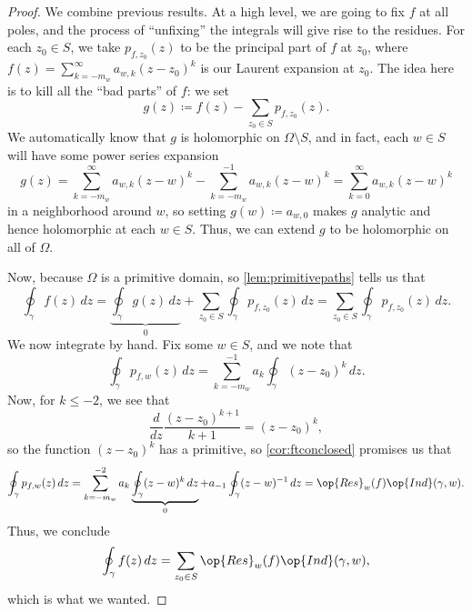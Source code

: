 \begin{proof}
	We combine previous results. At a high level, we are going to fix $f$ at all poles, and the process of ``unfixing'' the integrals will give rise to the residues. For each $z_0\in S$, we take $p_{f,z_0}(z)$ to be the principal part of $f$ at $z_0$, where
	$f(z)=\sum_{k=-m_w}^\infty a_{w,k}(z-z_0)^k$
	is our Laurent expansion at $z_0$. The idea here is to kill all the ``bad parts'' of $f$: we set
	\[g(z)\coloneqq f(z)-\sum_{z_0\in S}p_{f,z_0}(z).\]
	We automatically know that $g$ is holomorphic on $\Omega\setminus S$, and in fact, each $w\in S$ will have some power series expansion
	\[g(z)=\sum_{k=-m_w}^\infty a_{w,k}(z-w)^k-\sum_{k=-m_w}^{-1}a_{w,k}(z-w)^k=\sum_{k=0}^\infty a_{w,k}(z-w)^k\]
	in a neighborhood around $w$, so setting $g(w)\coloneqq a_{w,0}$ makes $g$ analytic and hence holomorphic at each $w\in S$. Thus, we can extend $g$ to be holomorphic on all of $\Omega$.

	Now, because $\Omega$ is a primitive domain, so \autoref{lem:primitivepaths} tells us that
	\[\oint_\gamma f(z)\,dz=\underbrace{\oint_\gamma g(z)\,dz}_0+\sum_{z_0\in S}\oint_\gamma p_{f,z_0}(z)\,dz=\sum_{z_0\in S}\oint_\gamma p_{f,z_0}(z)\,dz.\]
	We now integrate by hand. Fix some $w\in S$, and we note that
	\[\oint_\gamma p_{f,w}(z)\,dz=\sum_{k=-m_w}^{-1}a_k\oint_\gamma(z-z_0)^k\,dz.\]
	Now, for $k\le-2$, we see that
	\[\frac d{dz}\frac{(z-z_0)^{k+1}}{k+1}=(z-z_0)^k,\]
	so the function $(z-z_0)^k$ has a primitive, so \autoref{cor:ftconclosed} promises us that
	\[\oint_\gamma p_{f,w}(z)\,dz=\sum_{k=-m_w}^{-2}a_k\underbrace{\oint_\gamma(z-w)^k\,dz}_0+a_{-1}\oint_\gamma(z-w)^{-1}\,dz=\op{Res}_{w}(f)\op{Ind}(\gamma,w).\]
	Thus, we conclude
	\[\oint_\gamma f(z)\,dz=\sum_{z_0\in S}\op{Res}_{w}(f)\op{Ind}(\gamma,w),\]
	which is what we wanted.
\end{proof}

